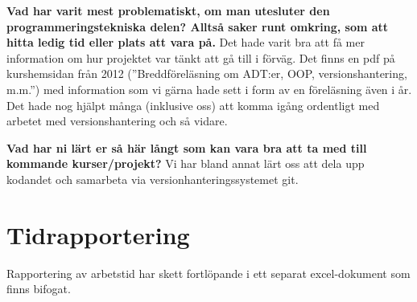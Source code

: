\documentclass{scrartcl}
\begin{document}
\textbf{Vad har varit mest problematiskt, om man utesluter den programmeringstekniska delen? Alltså saker runt omkring, som att hitta ledig tid eller plats att vara på.}
Det hade varit bra att få mer information om hur projektet var tänkt att gå till i förväg. Det finns en pdf på kurshemsidan från 2012 (''Breddföreläsning om ADT:er, OOP, versionshantering, m.m.'') med information som vi gärna hade sett i form av en föreläsning även i år. Det hade nog hjälpt många (inklusive oss) att komma igång ordentligt med arbetet med versionshantering och så vidare.

\textbf{Vad har ni lärt er så här långt som kan vara bra att ta med till kommande kurser/projekt?} Vi har bland annat lärt oss att dela upp kodandet och samarbeta via versionhanteringssystemet git.

\section{Tidrapportering}
Rapportering av arbetstid har skett fortlöpande i ett separat excel-dokument som finns bifogat. 
\end{document}
